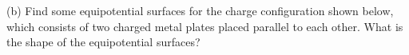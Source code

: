 \vspace{0.3cm}
{\centering {} \par}
\vspace{0.3cm}

(b) Find some equipotential surfaces for the charge configuration
shown below, which consists of two charged metal plates placed parallel
to each other. What is the shape of the equipotential surfaces?

\vspace{0.3cm}
{\centering {} \par}
\vspace{0.3cm}

